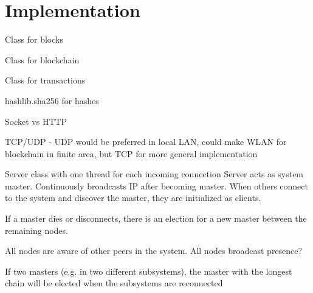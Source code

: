 \chapter{Implementation}

Class for blocks

Class for blockchain

Class for transactions

hashlib.sha256 for hashes 


Socket vs HTTP

TCP/UDP - UDP would be preferred in local LAN, could make WLAN for blockchain in finite area, but TCP for more general implementation 


Server class with one thread for each incoming connection
Server acts as system master. Continuously broadcasts IP after becoming master. When others connect to the system and discover the master, they are initialized as clients. 

If a master dies or disconnects, there is an election for a new master between the remaining nodes. 

All nodes are aware of other peers in the system. All nodes broadcast presence? 

If two masters (e.g. in two different subsystems), the master with the longest chain will be elected when the subsystems are reconnected